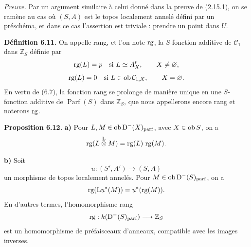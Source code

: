\documentclass[11pt]{article}
\newcommand{\cl}{\operatorname{cl}}
\newcommand{\Parf}{\operatorname{Parf}}
\newcommand{\Tor}{\operatorname{Tor}}
\providecommand{\cC}{\mathcal C}
\providecommand{\Tor}{\operatorname{Tor}}
\providecommand{\Ker}{\operatorname{Ker}}
\begin{document}
\emph{Preuve.} Par un argument similaire à celui donné dans la preuve de (2.15.1), on se ramène au cas où \((S,A)\) est le topos localement annelé défini par un préschéma, et dans ce cas l'assertion est triviale : prendre un point dans \(U\).

\textbf{Définition 6.11.} On appelle rang, et l'on note \(\rg\), la \(S\)-fonction additive de \(\mathcal C_1\) dans \(\mathbb Z_S\) définie par
\[
  \rg(L)=p\quad\text{si } L\simeq A_X^p,
  \qquad X\ne\varnothing,
\]
\[
  \rg(L)=0\quad\text{si } L\in\Ob\mathcal C_{1,X},
  \qquad X=\varnothing.
\]
En vertu de (6.7), la fonction rang se prolonge de manière unique en une \(S\)-fonction additive de \(\Parf(S)\) dans \(\mathbb Z_S\), que nous appellerons encore rang et noterons \(\rg\).

\textbf{Proposition 6.12.} \textbf{a)} Pour \(L,M\in\Ob\Dpx^-(X)_{\mathrm{parf}}\), avec \(X\in\Ob S\), on a
\[
  \rg(L\overset{\mathrm L}{\otimes} M)=\rg(L)\,\rg(M).
\]

\textbf{b)} Soit
\[
  u:(S',A')\longrightarrow(S,A)
\]
un morphisme de topos localement annelés. Pour \(M\in\Ob\Dpx^-(S)_{\mathrm{parf}}\), on a
\[
  \rg(\mathrm L u^*(M))=u^*(\rg(M)).
\]
En d'autres termes, l'homomorphisme rang
\[
  \rg:k(\Dpx^-(S)_{\mathrm{parf}})\longrightarrow \mathbb Z_S
\]
est un homomorphisme de préfaisceaux d'anneaux, compatible avec les images inverses.



\providecommand{\Cpx}{\mathrm C}
\providecommand{\Kpx}{\mathrm K}
\providecommand{\Dpx}{\mathrm D}
\providecommand{\Ho}{\mathrm H}
\providecommand{\RHom}{\mathrm R\!\operatorname{Hom}}
\providecommand{\Ob}{\operatorname{ob}}
\providecommand{\Hom}{\operatorname{Hom}}
\providecommand{\RHom}{\mathrm R\!\operatorname{Hom}}
\providecommand{\Ext}{\operatorname{Ext}}
\providecommand{\Tor}{\operatorname{Tor}}
\providecommand{\Tr}{\operatorname{Tr}}
\providecommand{\Add}{\operatorname{Add}}
\providecommand{\Cart}{\operatorname{Cart}}
\providecommand{\Parf}{\operatorname{Parf}}
\providecommand{\coh}{\operatorname{coh}}
\providecommand{\amp}{\operatorname{amp}}
\providecommand{\cl}{\operatorname{cl}}
\providecommand{\rg}{\operatorname{rg}}
\providecommand{\Id}{\operatorname{Id}}
\providecommand{\Ker}{\operatorname{Ker}}
\providecommand{\Im}{\operatorname{Im}}
\providecommand{\cH}{\mathcal H}
\providecommand{\Zs}{\mathbb Z_S}
\providecommand{\A}{\mathcal A}
\providecommand{\cC}{\mathcal C}
\providecommand{\cCzero}{\mathcal C_0}
\providecommand{\otL}{\mathop{\otimes}^{\mathrm L}}
\providecommand{\tamp}{\operatorname{tor.amp}}
\providecommand{\pamp}{\operatorname{parf.amp}}
\providecommand{\pdim}{\operatorname{parf.dim}}
\providecommand{\bon}{\mathrm b}
\providecommand{\parf}{\operatorname{parf}}
\providecommand{\parff}{\operatorname{parf}}
\providecommand{\ac}{\mathrm{ac}}
\end{document}
